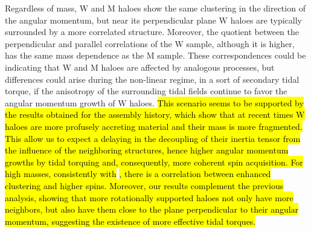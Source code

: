 \documentclass[fleqn,usenatbib]{mnras}
\newcommand{\Wh}{\mathrm{W}}
\newcommand{\Mh}{\mathrm{M}}
\begin{document}
Regardless of mass, $\Wh$ and $\Mh$ haloes show the same clustering in the direction of the angular momentum, but near its perpendicular plane $\Wh$ haloes are typically surrounded by a more correlated structure. Moreover, the quotient between the perpendicular and parallel correlations of the $\Wh$ sample, although it is higher, has the same mass dependence as the $\Mh$ sample.
These correspondences could be indicating that $\Wh$ and $\Mh$ haloes are affected by analogous processes, but differences could arise during the non-linear regime, in a sort of secondary tidal torque, if the anisotropy of the surrounding tidal fields continue to favor the angular momentum growth of $\Wh$ haloes. \hl{This scenario seems to be supported by the results obtained for the assembly history, which show that at recent times $\Wh$ haloes are more profusely accreting material and their mass is more fragmented. This allow us to expect a delaying in the decoupling of their inertia tensor from the influence of the neighboring structures, hence higher angular momentum growths by tidal torquing and, consequently, more coherent spin acquisition. For high masses, consistently with} \citet{faltenbacherywhite2010}\hl{, there is a correlation between enhanced clustering and higher spins. Moreover, our results complement the previous analysis, showing that more rotationally supported haloes not only have more neighbors, but also have them close to the plane perpendicular to their angular momentum, suggesting the existence of more effective tidal torques.}
\end{document}
